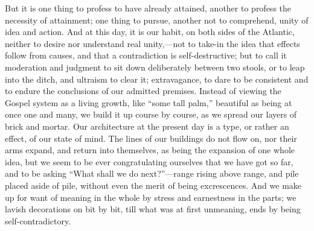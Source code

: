 But it is one thing to profess to have already
attained, another to profess the necessity of attainment; one thing to
pursue, another not to comprehend, unity of idea and action. And at
this day, it is our habit, on both sides of the Atlantic, neither to
desire nor understand real unity,—not to take-in the idea that
effects follow from causes, and that a contradiction is
self-destructive; but to call it moderation and judgment to sit down
deliberately between two stools, or to leap into the ditch, and
ultraism to clear it; extravagance, to dare to be consistent and to
endure the conclusions of our admitted premises. Instead of viewing
the Gospel system as a living growth, like ``some tall palm,'' beautiful
as being at once one and many, we build it up course by course, as we
spread our layers of brick and mortar. Our architecture at the present
day is a type, or rather an effect, of our state of mind. The lines of
our buildings do not flow on, nor their arms expand, and return into
themselves, as being the expansion of one whole idea, but we seem to
be ever congratulating ourselves that we have got so far, and to be
asking ``What shall we do next?''—range rising above range, and pile
placed aside of pile, without even the merit of being excrescences.
And we make up for want of meaning in the whole by stress and
earnestness in the parts; we lavish decorations on bit by bit, till
what was at first unmeaning, ends by being self-contradictory.

